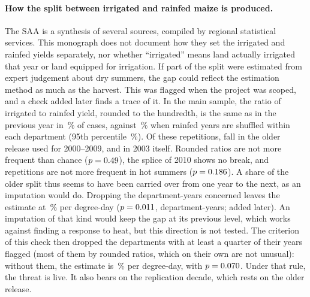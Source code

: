 \paragraph{How the split between irrigated and rainfed maize is produced.} The SAA is a synthesis of several sources, compiled by regional statistical services. This monograph does not document how they set the irrigated and rainfed yields separately, nor whether ``irrigated'' means land actually irrigated that year or land equipped for irrigation. If part of the split were estimated from expert judgement about dry summers, the gap could reflect the estimation method as much as the harvest. This was flagged when the project was scoped, and a check added later finds a trace of it. In the main sample, the ratio of irrigated to rainfed yield, rounded to the hundredth, is the same as in the previous year in \SaaRepPct\,\% of cases, against \SaaRepRefPct\,\% when rainfed years are shuffled within each department (95th percentile \SaaRepPnf\,\%). Of these \SaaRepTot{} repetitions, \SaaRepOld{} fall in the older release used for 2000--2009, and \SaaRepTwoThousandThree{} in 2003 itself. Rounded ratios are not more frequent than chance ($p = 0.49$), the splice of 2010 shows no break, and repetitions are not more frequent in hot summers ($p = 0.186$). A share of the older split thus seems to have been carried over from one year to the next, as an imputation would do. Dropping the \SaaRepTot{} department-years concerned leaves the estimate at \NoRepeatPct\,\% per degree-day ($p = 0.011$, \NoRepeatN{} department-years; added later). An imputation of that kind would keep the gap at its previous level, which works against finding a response to heat, but this direction is not tested. The criterion of this check then dropped the \SaaSixDeps{} departments with at least a quarter of their years flagged (most of them by rounded ratios, which on their own are not unusual): without them, the estimate is \SaaSixPct\,\% per degree-day, with $p = 0.070$. Under that rule, the threat is live. It also bears on the replication decade, which rests on the older release.

